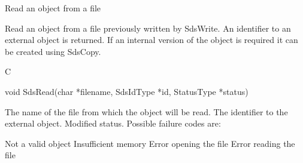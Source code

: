 \begin{manroutinedescription}
      Read an {} object from a file

      Read an {} object from a file previously written by SdsWrite.
      An identifier to an external object is returned. If an internal
      version of the object is required it can be created using SdsCopy.
 
      C

      void SdsRead(char *filename, SdsIdType *id, StatusType *status)
 
\begin{manparametertable}
 The name of the file from %
which the object
                              will be read.
 The identifier to the external %
object.
 Modified status. Possible %
failure codes are:

\end{manparametertable}
\begin{mantwocolumntable}
Not a valid {} object
Insufficient memory
Error opening the file
Error reading the file
\end{mantwocolumntable}
\end{manroutinedescription}
